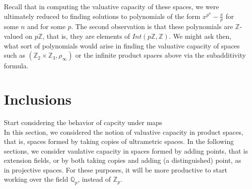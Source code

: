 Recall that in computing the valuative capacity of these spaces, we were ultimately reduced to finding solutions to polynomials of the form $x^{p^n} - \frac{x}{p}$ for some $n$ and for some $p$. The second observation is that these polynomials are $\mathbb{Z}$-valued on $p\mathbb{Z}$, that is, they are elements of $Int(p\mathbb{Z},\mathbb{Z})$. We might ask then, what sort of polynomials would arise in finding the valuative capacity of spaces such as $(\mathbb{Z}_2 \times \mathbb{Z}_3, \rho_\infty)$ or the infinite product spaces above via the subadditivity formula. 



\section*{Inclusions}
Start considering the behavior of capcity under maps\\

In this section, we considered the notion of valuative capacity in product spaces, that is, spaces formed by taking copies of ultrametric spaces. In the following sections, we consider  vaulative capacity in spaces formed by adding points, that is extension fields, or by both taking copies and adding (a distinguished) point, as in projective spaces. For these purposes, it will be more productive to start working over the field $\mathbb{Q}_p$, instead of $\mathbb{Z}_p$.




































